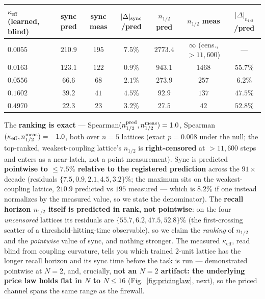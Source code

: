 \documentclass[11pt]{article}
\newcommand{\keff}{\kappa_{\mathrm{eff}}}
\begin{document}
\begin{center}\footnotesize\setlength{\tabcolsep}{4pt}
\begin{tabular}{lcccccc}
\toprule
$\keff$ (learned, blind) & sync \textbf{pred} & sync \textbf{meas} & $\lvert\Delta\rvert_{\rm sync}$/pred & $n_{1/2}$ \textbf{pred} & $n_{1/2}$ \textbf{meas} & $\lvert\Delta\rvert_{n_{1/2}}$/pred \\
\midrule
$0.0055$ & $210.9$ & $195$ & $7.5\%$ & $2773.4$ & $\infty$ (cens., $>11{,}600$) & --- \\
$0.0163$ & $123.1$ & $122$ & $0.9\%$ & $943.1$ & $1468$ & $55.7\%$ \\
$0.0556$ & $66.6$ & $68$ & $2.1\%$ & $273.9$ & $257$ & $6.2\%$ \\
$0.1602$ & $39.2$ & $41$ & $4.5\%$ & $92.9$ & $137$ & $47.5\%$ \\
$0.4970$ & $22.3$ & $23$ & $3.2\%$ & $27.5$ & $42$ & $52.8\%$ \\
\bottomrule
\end{tabular}
\end{center}

The \textbf{ranking is exact} --- Spearman$(n_{1/2}^{\rm pred},n_{1/2}^{\rm meas})=1.0$, Spearman$(\keff,n_{1/2}^{\rm meas})=-1.0$, both over $n=5$ lattices (exact $p=0.008$ under the null; the top-ranked, weakest-coupling lattice's $n_{1/2}$ is \textbf{right-censored} at $>11{,}600$ steps and enters as a near-latch, not a point measurement). Sync is predicted \textbf{pointwise to $\le7.5\%$ relative to the registered prediction} across the $91\times$ decade (residuals $\{7.5,0.9,2.1,4.5,3.2\}\%$; the maximum sits on the weakest-coupling lattice, $210.9$ predicted vs $195$ measured --- which is $8.2\%$ if one instead normalizes by the measured value, so we state the denominator). The \textbf{recall horizon $n_{1/2}$ itself is predicted in rank, not pointwise}: on the four \emph{uncensored} lattices its residuals are $\{55.7,6.2,47.5,52.8\}\%$ (the first-crossing scatter of a threshold-hitting-time observable), so we claim the \emph{ranking} of $n_{1/2}$ and the \emph{pointwise} value of sync, and nothing stronger. The measured $\keff$, read blind from coupling curvature, tells you which trained $2$-unit lattice has the longer recall horizon and its sync time before the task is run --- demonstrated pointwise at $N=2$, and, crucially, \textbf{not an $N=2$ artifact: the underlying price law holds flat in $N$ to $N\le16$} (Fig.~\ref{fig:pricinglaw}, next), so the priced channel spans the same range as the firewall.
\end{document}
